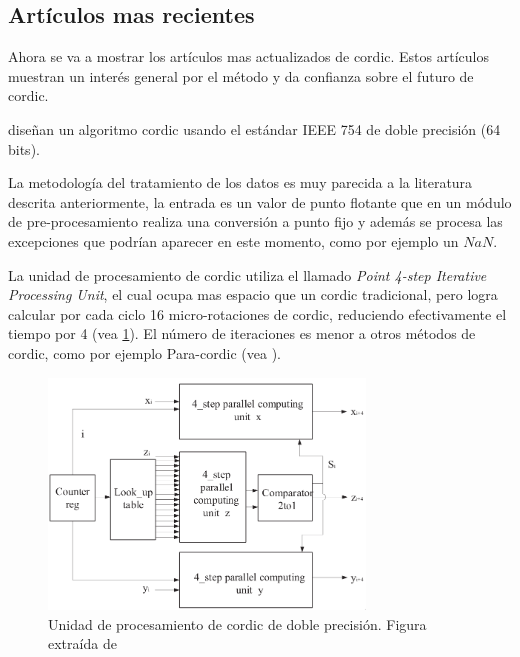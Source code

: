 \subsection{Artículos mas recientes}
Ahora se va a mostrar los artículos mas actualizados de \gls{cordic}. Estos artículos muestran un interés general por el método y da confianza sobre el futuro de \gls{cordic}.

\cite{hou_low_2019} diseñan un algoritmo \gls{cordic} usando el estándar IEEE 754 de doble precisión (64 bits).

La metodología del tratamiento de los datos es muy parecida a la literatura descrita anteriormente, la entrada es un valor de punto flotante que en un módulo de pre-procesamiento realiza una conversión a punto fijo y además se procesa las excepciones que podrían aparecer en este momento, como por ejemplo un $NaN$.

La unidad de procesamiento de \gls{cordic} utiliza el llamado \textit{Point 4-step Iterative Processing Unit}, el cual ocupa mas espacio que un \gls{cordic} tradicional, pero logra calcular por cada ciclo 16 micro-rotaciones de \gls{cordic}, reduciendo efectivamente el tiempo por 4 (vea \ref{graf:2019_4-step-64bit}). El número de iteraciones es menor a otros métodos de \gls{cordic}, como por ejemplo Para-\gls{cordic} (vea \cite{tso-bing_juang_para-cordic_2004}).

\begin{figure}[ht]
	\centering
	\includegraphics[width=0.75\textwidth]{archivos/CORDIC/2019_4-step-64bit.png}
	\caption{Unidad de procesamiento de \gls{cordic} de doble precisión. Figura extraída de \cite{yeshwanth_high-speed_2018}}
	\label{graf:2019_4-step-64bit}
\end{figure}

\begin{table}[]
	\centering
	\caption{Número de iteraciones comparando el multiplicador \gls{cordic} con punto flotante de \cite{yeshwanth_high-speed_2018} a otras soluciones.}
	\label{table:2019_4-step-comp-64bit}
\end{table}


